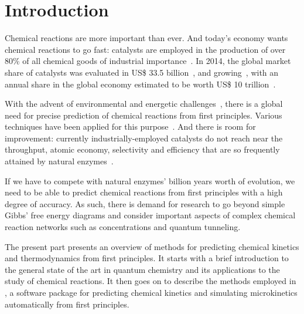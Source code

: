 \chapter{Introduction}%
\label{ch:introduction}

Chemical reactions are more important than ever.
And today's economy wants chemical reactions to go fast:
catalysts are employed in the production of over 80\% of all chemical
goods of industrial
importance~\cite{Breakthrough_Catalyst,GlobalCatalystMarket}.
In 2014, the global market share of catalysts was evaluated in US\$ 33.5
billion~\cite{GlobalCatalystMarket}, and growing~\cite{GlobalCatalystMarket},
with an annual share in the global economy estimated to be worth US\$ 10
trillion~\cite{GlobalCatalystMarket}.

With the advent of environmental and energetic challenges~\cite{Bertozzi_2016},
there is a global need for precise prediction of chemical reactions from first
principles.
Various techniques have been applied for this purpose~\cite{Cao2022}.
And there is room for improvement: currently industrially-employed catalysts do
not reach near the throughput, atomic economy, selectivity and efficiency that
are so frequently attained by natural
enzymes~\cite{Catalysis_in_Chemistry_and_Enzymology}.

If we have to compete with natural enzymes' billion years worth of evolution,
we need to be able to predict chemical reactions from first principles with a
high degree of accuracy.
As such, there is demand for research to go beyond simple Gibbs' free energy
diagrams and consider important aspects of complex chemical reaction networks
such as concentrations and quantum tunneling.

The present part presents an overview of methods for predicting chemical
kinetics and thermodynamics from first principles.
It starts with a brief introduction to the general state of the art in quantum
chemistry and its applications to the study of chemical reactions.
It then goes on to describe the methods employed in \overreact, a software
package for predicting chemical kinetics and simulating microkinetics
automatically from first principles.
